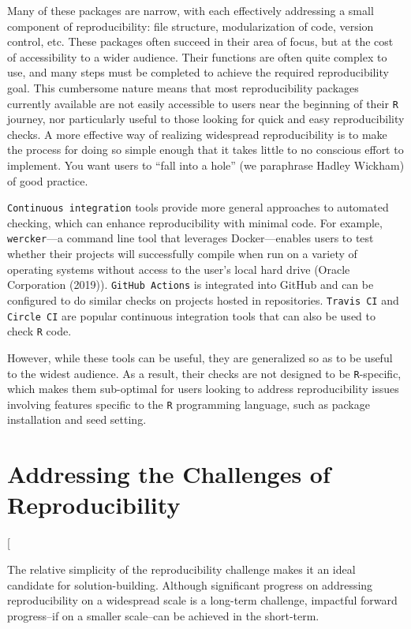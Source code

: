 \documentclass[12pt,twoside]{reedthesis}
\begin{document}
Many of these packages are narrow, with each effectively addressing a
small component of reproducibility: file structure, modularization of
code, version control, etc. These packages often succeed in their area
of focus, but at the cost of accessibility to a wider audience. Their
functions are often quite complex to use, and many steps must be
completed to achieve the required reproducibility goal. This cumbersome
nature means that most reproducibility packages currently available are
not easily accessible to users near the beginning of their \texttt{R}
journey, nor particularly useful to those looking for quick and easy
reproducibility checks. A more effective way of realizing widespread
reproducibility is to make the process for doing so simple enough that
it takes little to no conscious effort to implement. You want users to
``fall into a hole'' (we paraphrase Hadley Wickham) of good practice.

\texttt{Continuous\ integration} tools provide more general approaches
to automated checking, which can enhance reproducibility with minimal
code. For example, \texttt{wercker}---a command line tool that leverages
Docker---enables users to test whether their projects will successfully
compile when run on a variety of operating systems without access to the
user's local hard drive (Oracle Corporation (2019)).
\texttt{GitHub\ Actions} is integrated into GitHub and can be configured
to do similar checks on projects hosted in repositories.
\texttt{Travis\ CI} and \texttt{Circle\ CI} are popular continuous
integration tools that can also be used to check \texttt{R} code.

However, while these tools can be useful, they are generalized so as to
be useful to the widest audience. As a result, their checks are not
designed to be \texttt{R}-specific, which makes them sub-optimal for
users looking to address reproducibility issues involving features
specific to the \texttt{R} programming language, such as package
installation and seed setting.

\chapter{Addressing the Challenges of
Reproducibility}\label{my-solution}

{[}

The relative simplicity of the reproducibility challenge makes it an
ideal candidate for solution-building. Although significant progress on
addressing reproducibility on a widespread scale is a long-term
challenge, impactful forward progress--if on a smaller scale--can be
achieved in the short-term.
\end{document}
